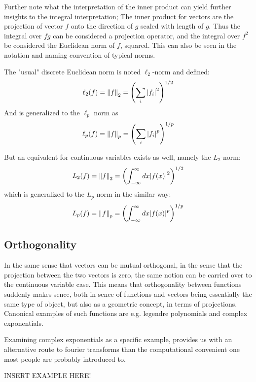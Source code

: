\documentclass[a4paper,twoside]{article}
\begin{document}
Further note what the interpretation of the inner product can yield further insights to the integral interpretation; 
The inner product for vectors are the projection of vector $f$ onto the direction of $g$ scaled with length of $g$. 
Thus the integral over $f g$ can be considered a projection operator, and the integral over $f^{2}$ be considered the Euclidean norm of $f$, squared. 
This can also be seen in the notation and naming convention of typical norms. 

The "usual" discrete Euclidean norm is noted $\ell_{2}$-norm and defined:
\begin{align*}
    \ell_{2}(f) = \norm{f}_{2} = \qty( \sum_{i} \abs {f_{i}}^{2})^{1/2}
\end{align*}
And is generalized to the $\ell_{p}$ norm as
\begin{align*}
    \ell_{p}(f) = \norm{f}_{p} = \qty( \sum_{i} \abs{f_{i}}^{p})^{1/p}
\end{align*}

But an equivalent for continuous variables exists as well, namely the $L_{2}$-norm:
\begin{align*}
    L_{2}(f) = \norm{f}_{2} = \qty( \int_{-\infty}^{\infty} \dd x \abs{f(x)}^{2})^{1/2}
\end{align*}
which is generalized to the $L_{p}$ norm in the similar way:
\begin{align*}
    L_{p}(f) = \norm{f}_{p} = \qty( \int_{-\infty}^{\infty} \dd x \abs{f(x)}^{p})^{1/p}
\end{align*}


\subsection{Orthogonality}
In the same sense that vectors can be mutual orthogonal, in the sense that the projection between the two vectors is zero, the same notion can be carried over to the continuous variable case. 
This means that orthogonality between functions suddenly makes sence, both in sence of functions and vectors being essentially the same type of object, but also as a geometric concept, in terms of projections. 
Canonical examples of such functions are e.g. legendre polynomials and complex exponentials.  

Examining complex exponentials as a specific example, provides us with an alternative route to fourier transforms than the computational convenient one most people are probably introduced to. 

INSERT EXAMPLE HERE!
\end{document}
